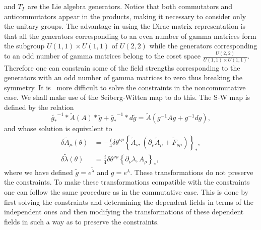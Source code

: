 \documentclass[a4paper,a4paper]{article}
\begin{document}
and $T_{I\text{ }}$are the Lie algebra generators. Notice that both
commutators and anticommutators appear in the products, making it necessary to
consider only the unitary groups. The advantage in using the Dirac matrix
representation is that all the generators corresponding to an even number of
gamma matrices form the subgroup $U(1,1)\times U(1,1)$ of $U(2,2)$ while the
generators corresponding to an odd number of gamma matrices belong to the
coset space $\frac{U(2,2)}{U(1,1)\times U(1,1)}$. Therefore one can constrain
some of the field strengths corresponding to the generators with an odd number
of gamma matrices to zero thus breaking the symmetry. It is \ more difficult
to solve the constraints in the noncommutative case. We shall make use of the
Seiberg-Witten map to do this. The S-W map is defined by the relation
\cite{SW}
\[
\widetilde{g_{\ast}}^{-1}\ast\widetilde{A}(A)\ast\widetilde{g}+\widetilde
{g_{\ast}}^{-1}\ast d\widetilde{g}=\widetilde{A}(g^{-1}Ag+g^{-1}dg),
\]
and whose solution is equivalent to \cite{SW}
\begin{align*}
\delta\widetilde{A}_{\mu}\left(  \theta\right)   &  =-\frac{i}{4}\delta
\theta^{\nu\rho}\left\{  \widetilde{A}_{\nu},\left(  \partial_{\rho}%
\widetilde{A}_{\mu}+\widetilde{F}_{\rho\mu}\right)  \right\}  _{\ast},\\
\delta\widetilde{\lambda}\left(  \theta\right)   &  =\frac{i}{4}\delta
\theta^{\nu\rho}\left\{  \partial_{\nu}\lambda,A_{\rho}\right\}  _{\ast},
\end{align*}
where we have defined $\widetilde{g}=e^{\widetilde{\lambda}}$ and
$g=e^{\lambda}.$ These transformations do not preserve the constraints. To
make these transformations compatible with the constraints one can follow the
same procedure as in the commutative case. This is done by first solving the
constraints and determining the dependent fields in terms of the independent
ones and then modifying the transformations of these dependent fields in such
a way as to preserve the constraints.
\end{document}
